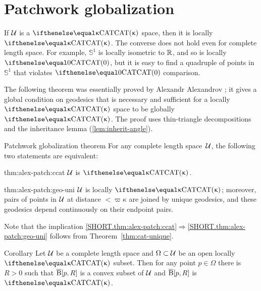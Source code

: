 
\section{Patchwork globalization}\label{sec:patchwork}

If $\mathcal{U}$ is a $\CAT\kappa$ space, then it is locally $\CAT\kappa$.
The converse does not hold even for complete length space.
For example, $\mathbb{S}^1$ is locally isometric to $\mathbb{R}$, and so
is locally $\CAT0$, but it is easy to find a quadruple of points in $\mathbb{S}^1$ that violates $\CAT0$ comparison.  

The following theorem was essentially proved by Alexandr Alexandrov \cite[Satz 9]{alexandrov:devel}; 
it gives a global condition on geodesics that is  necessary and sufficient for a locally $\CAT\kappa$ space to be globally $\CAT\kappa$. 
The proof uses thin-triangle decompositions 
and the inheritance lemma (\ref{lem:inherit-angle}). 

\begin{thm}{Patchwork globalization theorem}\label{thm:alex-patch}
For any complete length space~$\mathcal{U}$, the following two statements are equivalent:

\begin{subthm}{thm:alex-patch:ccat}
$\mathcal{U}$ is $\CAT\kappa$.
\end{subthm}
 
\begin{subthm}{thm:alex-patch:geo-uni}
$\mathcal{U}$ is locally $\CAT\kappa$; moreover,  pairs of points in $\mathcal{U}$ at distance $<\varpi\kappa$ are joined by unique geodesics, and these geodesics depend continuously on their endpoint pairs.
\end{subthm}

\end{thm}

Note that the implication \ref{SHORT.thm:alex-patch:ccat}$\Rightarrow$\ref{SHORT.thm:alex-patch:geo-uni} follows from Theorem~\ref{thm:cat-unique}.

\begin{thm}{Corollary}\label{cor:k-for-k}
Let $\mathcal{U}$ be a complete length  space 
and $\Omega\subset\spc{U}$ be an open locally $\CAT\kappa$ subset. 
Then for any point $p\in \Omega$ there is $R>0$ such that $\overline{\mathrm{B}}{}[p,R]$ is a convex subset of $\mathcal{U}$ 
and $\overline{\mathrm{B}}{}[p,R]$ is $\CAT\kappa$.
\end{thm}

